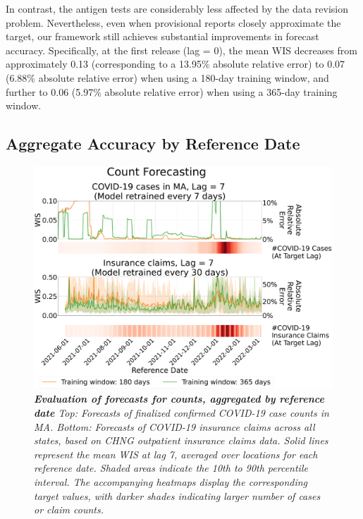 In contrast, the antigen tests are considerably less affected by the data revision problem. Nevertheless, even when provisional reports closely approximate the target, our framework still achieves substantial improvements in forecast accuracy. Specifically, at the first release (lag = 0), the mean WIS decreases from approximately 0.13 (corresponding to a 13.95\% absolute relative error) to 0.07 (6.88\% absolute relative error) when using a 180-day training window, and further to 0.06 (5.97\% absolute relative error) when using a 365-day training window.

\subsection{Aggregate Accuracy by Reference Date}

\begin{figure}[h!]
    \centering
    \includegraphics[width=\textwidth]{figs/experiment_count_result_time_series.pdf}
    \caption{\emph{\textbf{Evaluation of forecasts for counts, aggregated by reference date} Top: Forecasts of finalized confirmed COVID-19 case counts in MA. Bottom: Forecasts of COVID-19 insurance claims across all states, based on CHNG outpatient insurance claims data. Solid lines represent the mean WIS at lag 7, averaged over locations for each reference date. Shaded areas indicate the 10th to 90th percentile interval. The accompanying heatmaps display the corresponding target values, with darker shades indicating larger number of cases or claim counts.}}
\end{figure}

